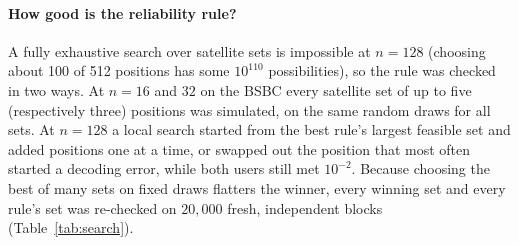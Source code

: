 \documentclass[11pt]{article}
\begin{document}
\paragraph{How good is the reliability rule?} A fully exhaustive search over satellite sets is impossible at $n=128$ (choosing about 100 of 512 positions has some $10^{110}$ possibilities), so the rule was checked in two ways. At $n=16$ and $32$ on the BSBC every satellite set of up to five (respectively three) positions was simulated, on the same random draws for all sets. At $n=128$ a local search started from the best rule's largest feasible set and added positions one at a time, or swapped out the position that most often started a decoding error, while both users still met $10^{-2}$. Because choosing the best of many sets on fixed draws flatters the winner, every winning set and every rule's set was re-checked on $20{,}000$ fresh, independent blocks (Table~\ref{tab:search}).

\begin{table}[t]
\centering
\caption{Satellite sets of the paper's construction: the best reliability rule against exhaustive search ($n=16,32$, BSBC) and local search ($n=128$). ``Positions'' is the largest number of satellite information bits with both users at block error rate $\le10^{-2}$; the last columns are block error rates (strong, weak user) on fresh draws.}
\label{tab:search}
\end{table}
\end{document}
